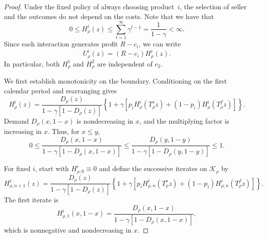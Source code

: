 \documentclass[11pt]{article}
\begin{document}
\begin{proof}
Under the fixed policy of always choosing product~$i$, the selection of seller and the outcomes do not depend on the costs. Note that we have that 
\begin{equation*}
0\leq H_\rho^i(z)
\leq\sum_{t=1}^{\infty}\gamma^{t-1}
=\frac{1}{1-\gamma}<\infty.
\end{equation*}
Since each interaction generates profit $R-c_i$, we can write 
\begin{equation}
U_\rho^i(z)=(R-c_i)H_\rho^i(z).
\end{equation}
In particular, both $H_\rho^1$ and $H_\rho^2$ are independent of $c_2$.

We first establish monotonicity on the boundary. Conditioning on
the first calendar period and rearranging gives
\begin{equation}
H_\rho^i(z)
=
\frac{D_\rho(z)}{1-\gamma[1-D_\rho(z)]}
\left\{
1+\gamma\left[
p_iH_\rho^i(T_\rho^s z)
+(1-p_i)H_\rho^i(T_\rho^f z)
\right]
\right\}.
\end{equation}
Demand $D_\rho(x,1-x)$ is nondecreasing in $x$, and the multiplying factor is increasing in $x$.
Thus, for $x\le y$,
\begin{equation}
0\le
\frac{D_\rho(x,1-x)}
{1-\gamma[1-D_\rho(x,1-x)]}
\le
\frac{D_\rho(y,1-y)}
{1-\gamma[1-D_\rho(y,1-y)]}
\le1.
\end{equation}

For fixed $i$, start with $H_{\rho,0}^i\equiv0$ and define the
successive iterates on $\mathcal K_\rho$ by
\begin{equation}
H_{\rho,n+1}^i(z)
=
\frac{D_\rho(z)}{1-\gamma[1-D_\rho(z)]}
\left\{
1+\gamma\left[
p_iH_{\rho,n}^i(T_\rho^s z)
+(1-p_i)H_{\rho,n}^i(T_\rho^f z)
\right]
\right\}.
\end{equation}
The first iterate is
\begin{equation}
H_{\rho,1}^i(x,1-x)
=
\frac{D_\rho(x,1-x)}
{1-\gamma[1-D_\rho(x,1-x)]},
\end{equation}
which is nonnegative and nondecreasing in $x$.


\end{proof}
\end{document}
